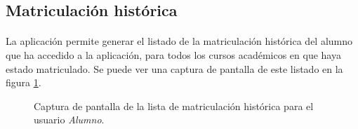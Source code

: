 \subsection{Matriculación histórica}

  \paragraph{}La aplicación permite generar el listado de la matriculación
  histórica del alumno que ha accedido a la aplicación, para todos los cursos
  académicos en que haya estado matriculado. Se puede ver una captura de
  pantalla de este listado en la figura
  \ref{capturaPantallaMatriculacionHistorica}.

  \begin{figure}[!ht]
    \begin{center}
      \caption{Captura de pantalla de la lista de matriculación histórica para el usuario \textit{Alumno}.}
      \label{capturaPantallaMatriculacionHistorica}
    \end{center}
  \end{figure}
